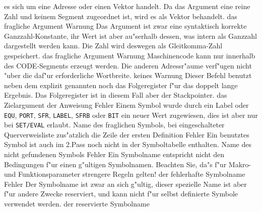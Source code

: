 \documentclass[12pt,a4paper,twoside]{report}
\newcommand{\tty}[1]{{\tt #1}}
\begin{document}
\begin{description}
{                es sich um eine Adresse oder einen Vektor handelt.  Da das Argument eine
                reine Zahl und keinem Segment zugeordnet ist, wird es als Vektor behandelt.}
               {das fragliche Argument}
               {Warnung}
               {Das Argument ist zwar eine syntaktisch korrekte Ganzzahl-Konstante, ihr
                Wert ist aber au"serhalb dessen, was intern als Ganzzahl dargestellt
                werden kann.  Die Zahl wird deswegen als Gleitkomma-Zahl gespeichert.}
               {das fragliche Argument}
               {Warnung}
               {Maschinencode kann nur innerhalb des CODE-Segments erzeugt werden. Die
                anderen Adressr"aume verf"ugen nicht "uber die daf"ur erforderliche
                Wortbreite.}
               {keines}
               {Warnung}
               {Dieser Befehl benutzt neben dem explizit genannten
                noch das Folgeregister f"ur das doppelt lange Ergebnis.
                Das Folgeregister ist in diesem Fall aber der
                Stackpointer.}
               {das Zielargument der Anweisung}
               {Fehler}
               {Einem Symbol wurde durch ein Label oder
	        \tty{EQU}, \tty{PORT}, \tty{SFR}, \tty{LABEL},
	        \tty{SFRB} oder \tty{BIT} ein neuer  Wert zugewiesen, dies
                ist aber nur bei \tty{SET/EVAL} erlaubt.}
               {Name des fraglichen Symbols, bei eingeschalteter
	        Querverweisliste zus"atzlich die Zeile der ersten Definition}
               {Fehler}
               {Ein benutztes Symbol ist auch im 2.Pass noch
                nicht in der Symboltabelle enthalten.}
               {Name des nicht gefundenen Symbols}
               {Fehler}
               {Ein Symbolname entspricht nicht den Bedingungen
                f"ur einen g"ultigen Symbolnamen.  Beachten Sie, da"s f"ur
                Makro-und Funktionsparameter strengere Regeln gelten!}
               {der fehlerhafte Symbolname}
               {Fehler}
               {Der Symbolname ist zwar an sich g"ultig, dieser spezielle
                Name ist aber f"ur andere Zwecke reserviert, und kann nicht
                f"ur selbst definierte Symbole verwendet werden.}
               {der reservierte Symbolname}

\end{description}
\end{document}
